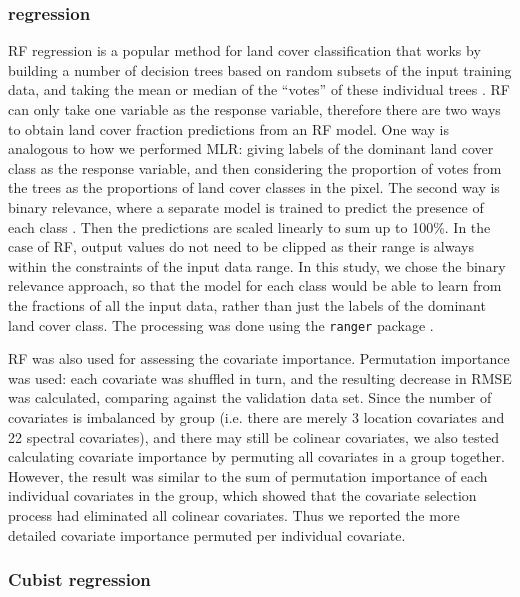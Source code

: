 \documentclass[a4paper,10pt]{article}
\begin{document}
\subsubsection{ regression}

\ac{RF} regression is a popular method for land cover classification that works by building a number of decision trees based on random subsets of the input training data, and taking the mean or median of the ``votes'' of these individual trees \citep{breiman2001random}.
\ac{RF} can only take one variable as the response variable, therefore there are two ways to obtain land cover fraction predictions from an \ac{RF} model.
One way is analogous to how we performed \ac{MLR}: giving labels of the dominant land cover class as the response variable, and then considering the proportion of votes from the trees as the proportions of land cover classes in the pixel.
The second way is binary relevance, where a separate model is trained to predict the presence of each class \citet{karalas2016br}.
Then the predictions are scaled linearly to sum up to 100\%.
In the case of \gls{RF}, output values do not need to be clipped as their range is always within the constraints of the input data range.
In this study, we chose the binary relevance approach, so that the model for each class would be able to learn from the fractions of all the input data, rather than just the labels of the dominant land cover class.
The processing was done using the \texttt{ranger} package \citep{ranger}.

\ac{RF} was also used for assessing the covariate importance.
Permutation importance was used: each covariate was shuffled in turn, and the resulting decrease in \gls{RMSE} was calculated, comparing against the validation data set.
Since the number of covariates is imbalanced by group (i.e. there are merely 3 location covariates and 22 spectral covariates), and there may still be colinear covariates, we also tested calculating covariate importance by permuting all covariates in a group together.
However, the result was similar to the sum of permutation importance of each individual covariates in the group, which showed that the covariate selection process had eliminated all colinear covariates.
Thus we reported the more detailed covariate importance permuted per individual covariate.

\subsubsection{Cubist regression}
\end{document}
